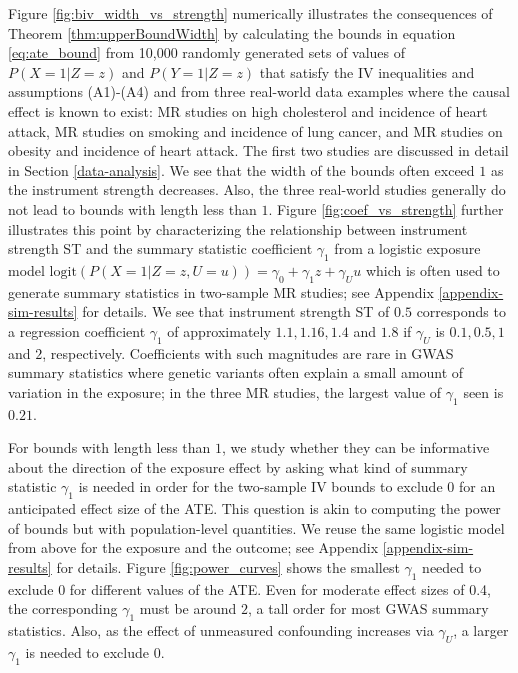 \documentclass[
]{article}
\theoremstyle{plain}
\begin{document}
Figure \ref{fig:biv_width_vs_strength} numerically illustrates the consequences of Theorem \ref{thm:upperBoundWidth} by calculating the bounds in equation \eqref{eq:ate_bound} from 10,000 randomly generated sets of values of \(P(X = 1 | Z = z)\) and \(P(Y = 1 | Z = z)\) that satisfy the IV inequalities and assumptions (A1)-(A4) and from three real-world data examples where the causal effect is known to exist: MR studies on high cholesterol and incidence of heart attack, MR studies on smoking and incidence of lung cancer, and MR studies on obesity and incidence of heart attack. The first two studies are discussed in detail in Section \ref{data-analysis}. We see that the width of the bounds often exceed \(1\) as the instrument strength decreases. Also, the three real-world studies generally do not lead to bounds with length less than \(1\). Figure \ref{fig:coef_vs_strength} further illustrates this point by characterizing the relationship between instrument strength ST and the summary statistic coefficient \(\gamma_1\) from a logistic exposure model \(\text{logit}(P(X = 1 | Z = z, U = u)) = \gamma_0 + \gamma_1 z + \gamma_U u\) which is often used to generate summary statistics in two-sample MR studies; see Appendix \ref{appendix-sim-results} for details. We see that instrument strength ST of \(0.5\) corresponds to a regression coefficient \(\gamma_1\) of approximately \(1.1, 1.16, 1.4\) and \(1.8\) if \(\gamma_U\) is \(0.1, 0.5, 1\) and \(2\), respectively. Coefficients with such magnitudes are rare in GWAS summary statistics where genetic variants often explain a small amount of variation in the exposure; in the three MR studies, the largest value of \(\gamma_1\) seen is \(0.21\).

For bounds with length less than \(1\), we study whether they can be informative about the direction of the exposure effect by asking what kind of summary statistic \(\gamma_1\) is needed in order for the two-sample IV bounds to exclude \(0\) for an anticipated effect size of the ATE. This question is akin to computing the power of bounds but with population-level quantities. We reuse the same logistic model from above for the exposure and the outcome; see Appendix \ref{appendix-sim-results} for details. Figure \ref{fig:power_curves} shows the smallest \(\gamma_1\) needed to exclude \(0\) for different values of the ATE. Even for moderate effect sizes of 0.4, the corresponding \(\gamma_1\) must be around \(2\), a tall order for most GWAS summary statistics. Also, as the effect of unmeasured confounding increases via \(\gamma_U\), a larger \(\gamma_1\) is needed to exclude \(0\).
\end{document}
